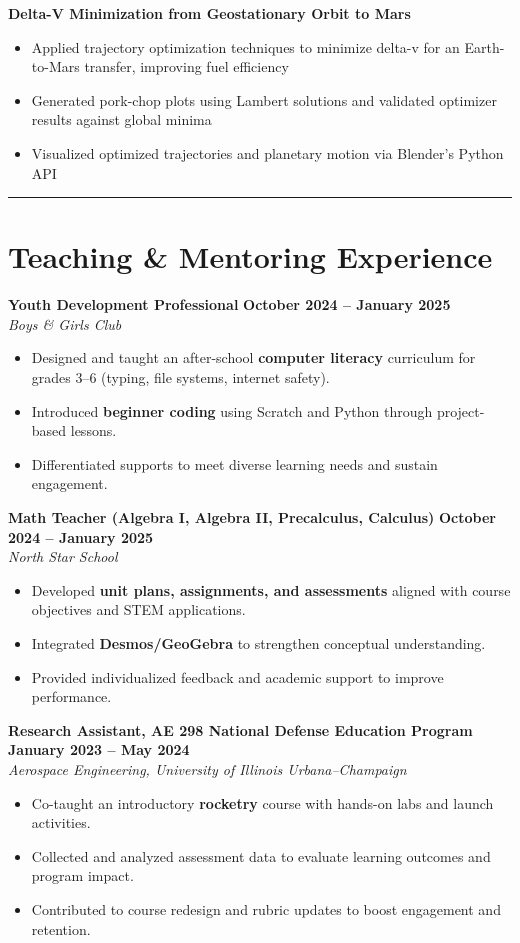 \documentclass[10pt]{article}
\newcommand{\sectionline}{\noindent\rule{\linewidth}{0.4pt}}
\begin{document}
	\textbf{Delta-V Minimization from Geostationary Orbit to Mars}
	\begin{itemize}
		\item Applied trajectory optimization techniques to minimize delta-v for an Earth-to-Mars transfer, improving fuel efficiency
		\item Generated pork-chop plots using Lambert solutions and validated optimizer results against global minima
		\item Visualized optimized trajectories and planetary motion via Blender’s Python API
	\end{itemize}
	
	\sectionline
	
	\section*{Teaching \& Mentoring Experience}
	
	\textbf{Youth Development Professional} \hfill \textbf{October 2024 -- January 2025} \\
	\emph{Boys \& Girls Club}
	\begin{itemize}
		\item Designed and taught an after-school \textbf{computer literacy} curriculum for grades 3–6 (typing, file systems, internet safety).
		\item Introduced \textbf{beginner coding} using Scratch and Python through project-based lessons.
		\item Differentiated supports to meet diverse learning needs and sustain engagement.
	\end{itemize}
	
	\textbf{Math Teacher (Algebra I, Algebra II, Precalculus, Calculus)} \hfill \textbf{October 2024 -- January 2025} \\
	\emph{North Star School}
	\begin{itemize}
		\item Developed \textbf{unit plans, assignments, and assessments} aligned with course objectives and STEM applications.
		\item Integrated \textbf{Desmos/GeoGebra} to strengthen conceptual understanding.
		\item Provided individualized feedback and academic support to improve performance.
	\end{itemize}
	
	\textbf{Research Assistant, AE 298 National Defense Education Program} \hfill \textbf{January 2023 -- May 2024} \\
	\emph{Aerospace Engineering, University of Illinois Urbana–Champaign}
	\begin{itemize}
		\item Co-taught an introductory \textbf{rocketry} course with hands-on labs and launch activities.
		\item Collected and analyzed assessment data to evaluate learning outcomes and program impact.
		\item Contributed to course redesign and rubric updates to boost engagement and retention.
	\end{itemize}
	
\end{document}
